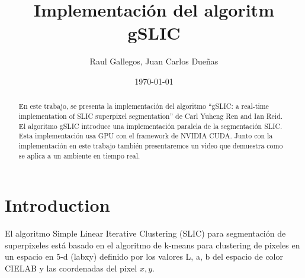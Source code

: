 \documentclass[11pt, oneside]{article}   	%
\title{Implementaci\'on del algoritm gSLIC}
\author{Raul Gallegos, Juan Carlos Due\~nas}
\date{\today}							%
\begin{document}
\maketitle
\begin{abstract}
En este trabajo, se presenta la implementaci\'on del algoritmo ``gSLIC: a real-time implementation of SLIC superpixel segmentation'' de Carl Yuheng Ren and Ian Reid\cite{YHRen_gSLIC}.
El algoritmo gSLIC introduce una implementaci\'on paralela de la segmentaci\'on SLIC. Esta implementaci\'on usa GPU con el framework de NVIDIA CUDA. Junto con la implementaci\'on en este trabajo tambi\'en presentaremos un video que demuestra como se aplica a un ambiente en tiempo real. 
\end{abstract}

\section{Introduction}
El algoritmo Simple Linear Iterative Clustering (SLIC) para segmentaci\'on de superpixeles est\'a basado en el algoritmo de k-means para clustering de pixeles en un espacio en 5-d (labxy) definido por los valores L, a, b del espacio de color CIELAB y las coordenadas del pixel $x,y$.


{}

\end{document}
